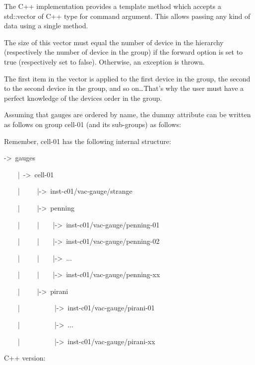 The C++ implementation provides a template method which accepts a
std::vector of \textquotedbl{}C++ type for command argument\textquotedbl{}.
This allows passing any kind of data using a single method.

The size of this vector must equal the number of device in the hierarchy
(respectively the number of device in the group) if the forward
option is set to true (respectively set to false). Otherwise, an exception
is thrown.

The first item in the vector is applied to the first device in the
group, the second to the second device in the group, and so on\ldots{}That's
why the user must have a \textquotedbl{}perfect\textquotedbl{} knowledge
of the devices order in the group. 

Assuming that gauges are ordered by name, the dummy attribute can
be written as follows on group \textquotedbl{}cell-01\textquotedbl{}
(and its sub-groups) as follows:

Remember, \textquotedbl{}cell-01\textquotedbl{} has the following
internal structure: 
\begin{lyxcode}
->~gauges~

~~~~|~->~cell-01

~~~~|~~~~~|->~inst-c01/vac-gauge/strange

~~~~|~~~~~|->~penning

~~~~|~~~~~|~~~~|->~inst-c01/vac-gauge/penning-01

~~~~|~~~~~|~~~~|->~inst-c01/vac-gauge/penning-02

~~~~|~~~~~|~~~~|->~...

~~~~|~~~~~|~~~~|->~inst-c01/vac-gauge/penning-xx

~~~~|~~~~~|->~pirani

~~~~|~~~~~~~~~~|->~inst-c01/vac-gauge/pirani-01

~~~~|~~~~~~~~~~|->~...

~~~~|~~~~~~~~~~|->~inst-c01/vac-gauge/pirani-xx
\end{lyxcode}
C++ version:

